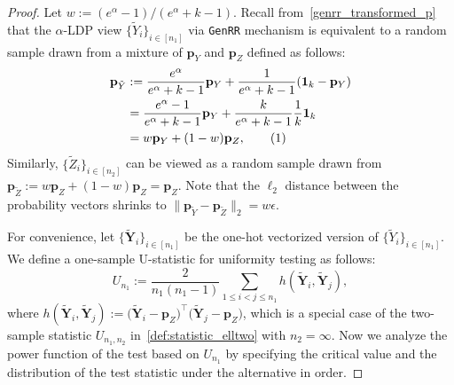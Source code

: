 \documentclass[twoside,11pt]{article}
\newcommand\numberthis{\addtocounter{equation}{1}\tag{\theequation}}
\newcommand{\rvTwo}{Y}
\newcommand{\rvThree}{Z}
\newcommand{\vectorize}[1]{\mathbf{#1}}
\newcommand{\sampleIndexOne}{i}
\newcommand{\sampleIndexTwo}{j}
\newcommand{\alphabetSize}{k} %
\newcommand{\sampleSize}{n}
\newcommand{\probVec}{\mathbf{p}} %
\newcommand{\privacyParameter}{\alpha} %
\begin{document}
\begin{appendix}
\begin{proof}
		Let $w :=(e^\privacyParameter-1)/(e^\privacyParameter + \alphabetSize-1)$.
		Recall from~\eqref{genrr_transformed_p} that
		the $\privacyParameter$-LDP view  $\{\tilde{\rvTwo}_i\}_{i\in [\sampleSize_1]}$ via \texttt{GenRR} mechanism is equivalent to a random sample drawn from a mixture of $\probVec_{\rvTwo}$ and $\probVec_{\rvThree}$ defined as follows:
		\begin{align*}
			\probVec_{\tilde{\rvTwo}}
			&:=
			\frac
			{e^{\alpha}}
			{e^{\alpha} + \alphabetSize - 1 }
			\probVec_{\rvTwo}
			+
			\frac
			{1}
			{e^{\alpha} + \alphabetSize - 1 }
			(\mathbf{1}_\alphabetSize-\probVec_{\rvTwo})	
			\\&=
			\frac
			{e^{\alpha}-1}
			{e^{\alpha} + \alphabetSize - 1 }
			\probVec_{\rvTwo}
			+
			\frac
			{\alphabetSize}
			{e^{\alpha} + \alphabetSize - 1 }
			\frac{1}{\alphabetSize}
			\mathbf{1}_\alphabetSize
			\\&=
			w\probVec_{\rvTwo} + (1-w)\probVec_{\rvThree},
			\numberthis
			\label{appendix:genrr_powerless:w}
		\end{align*}
		Similarly, $\{\tilde{\rvThree}_i\}_{i \in [n_2]}$
		can be viewed as a random sample drawn from
		$\probVec_{\tilde{\rvThree}} := 	w\probVec_\rvThree +  (1-w) \probVec_{\rvThree} = \probVec_{\rvThree}$.
		Note that the $\ell_2$ distance between the probability vectors shrinks to $\|\probVec_{\tilde{\rvTwo}} - \probVec_{\tilde{\rvThree}} \|_2 = w \epsilon$.
		
		For convenience, let $\{\tilde{\vectorize{\rvTwo}}_i\}_{i\in [\sampleSize_1]}$ be the one-hot vectorized version of $\{\tilde{\rvTwo}_i\}_{i\in [\sampleSize_1]}$.
		We define a one-sample U-statistic for uniformity testing as follows:
		\begin{equation}\label{appendix:genrr_powerless:test_statistic}
			U_{\sampleSize_1}
			:=	
			\frac{2}{\sampleSize_1(\sampleSize_1-1)}
			\sum_{1 \leq \sampleIndexOne < \sampleIndexTwo \leq \sampleSize_1}
			h(
			\tilde{\vectorize{\rvTwo}}_\sampleIndexOne, \tilde{\vectorize{\rvTwo}}_\sampleIndexTwo
			),
		\end{equation}
		where
		$
		h(
		\tilde{\vectorize{\rvTwo}}_\sampleIndexOne, \tilde{\vectorize{\rvTwo}}_\sampleIndexTwo
		):=
		\bigl(
		\tilde{\vectorize{\rvTwo}}_\sampleIndexOne
		- 
		\probVec_{\rvThree}
		\bigr)^\top
		\bigl(
		\tilde{\vectorize{\rvTwo}}_\sampleIndexTwo
		- 
		\probVec_{\rvThree}
		\bigr)$,
		which is a special case of the two-sample statistic $U_{\sampleSize_1, \sampleSize_2}$ in~\eqref{def:statistic_elltwo} with $\sampleSize_2 = \infty$. Now we analyze the power function of the test based on $U_{\sampleSize_1}$ by specifying the critical value and the distribution of the test statistic under the alternative in order.

\end{proof}
\end{appendix}
\end{document}
